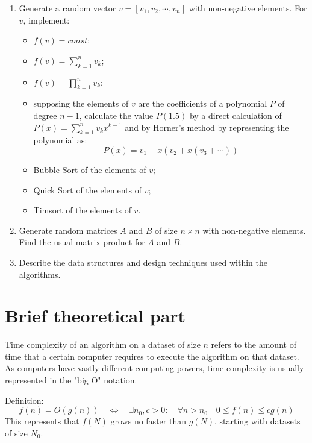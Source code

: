 \documentclass[12pt, a4paper]{article}
\begin{document}
\begin{enumerate}
\item Generate a random vector $v = [v_1, v_2, \cdots, v_n]$ with non-negative elements. For $v$, implement:
	\begin{itemize}
	\item $f(v) = const$;
	\item $f(v) = \sum_{k=1}^n v_k$;
	\item $f(v) = \prod_{k=1}^n v_k$;
	\item supposing the elements of $v$ are the coefficients of a polynomial $P$ of degree $n-1$, calculate the value $P(1.5)$ by a direct calculation of $P(x) = \sum_{k=1}^n v_k x^{k-1}$ and by Horner's method by representing the polynomial as:
		\[ P(x) = v_1 + x(v_2 + x(v_3 + \cdots)) \]
	\item Bubble Sort of the elements of $v$;
	\item Quick Sort of the elements of $v$;
	\item Timsort of the elements of $v$.
	\end{itemize}
\item Generate random matrices $A$ and $B$ of size $n\times n$ with non-negative elements. Find the usual matrix product for $A$ and $B$.
\item Describe the data structures and design techniques used within the algorithms.
\end{enumerate}

\section*{Brief theoretical part}

Time complexity of an algorithm on a dataset of size $n$ refers to the amount of time that a certain computer requires to execute the algorithm on that dataset. As computers have vastly different computing powers, time complexity is usually represented in the "big O" notation.

Definition:
\[ f(n) = O(g(n)) \quad\Leftrightarrow\quad \exists n_0, c>0: \quad \forall n>n_0 \quad 0 \leq f(n) \leq cg(n) \]
This represents that $f(N)$ grows no faster than $g(N)$, starting with datasets of size $N_0$.
\end{document}
